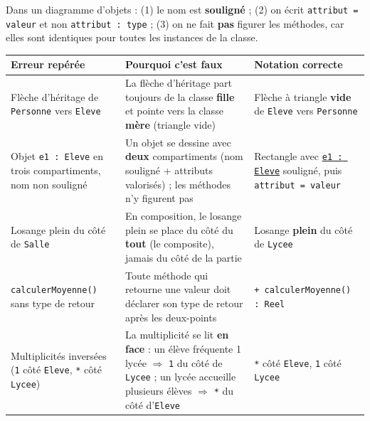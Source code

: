 \documentclass[11pt]{article}
\begin{document}
\begin{attention}
Dans un diagramme d'objets : (1) le nom est \textbf{souligné} ; (2) on écrit \texttt{attribut = valeur} et non \texttt{attribut : type} ; (3) on ne fait \textbf{pas} figurer les méthodes, car elles sont identiques pour toutes les instances de la classe.
\end{attention}

\begin{corrige}
\begin{center}
\small
\begin{tabularx}{\linewidth}{|X|X|X|}
\hline
\rowcolor{popblueL}\textbf{Erreur repérée} & \textbf{Pourquoi c'est faux} & \textbf{Notation correcte}\\
\hline
Flèche d'héritage de \texttt{Personne} vers \texttt{Eleve} & La flèche d'héritage part toujours de la classe \textbf{fille} et pointe vers la classe \textbf{mère} (triangle vide) & Flèche à triangle \textbf{vide} de \texttt{Eleve} vers \texttt{Personne}\\
\hline
Objet \texttt{e1 : Eleve} en trois compartiments, nom non souligné & Un objet se dessine avec \textbf{deux} compartiments (nom souligné + attributs valorisés) ; les méthodes n'y figurent pas & Rectangle avec \texttt{\underline{e1 : Eleve}} souligné, puis \texttt{attribut = valeur}\\
\hline
Losange plein du côté de \texttt{Salle} & En composition, le losange plein se place du côté du \textbf{tout} (le composite), jamais du côté de la partie & Losange \textbf{plein} du côté de \texttt{Lycee}\\
\hline
\texttt{calculerMoyenne()} sans type de retour & Toute méthode qui retourne une valeur doit déclarer son type de retour après les deux-points & \texttt{+ calculerMoyenne() : Reel}\\
\hline
Multiplicités inversées (\texttt{1} côté \texttt{Eleve}, \texttt{*} côté \texttt{Lycee}) & La multiplicité se lit \textbf{en face} : un élève fréquente 1 lycée $\Rightarrow$ \texttt{1} du côté de \texttt{Lycee} ; un lycée accueille plusieurs élèves $\Rightarrow$ \texttt{*} du côté d'\texttt{Eleve} & \texttt{*} côté \texttt{Eleve}, \texttt{1} côté \texttt{Lycee}\\
\hline
\end{tabularx}
\end{center}
\end{corrige}
\end{document}
